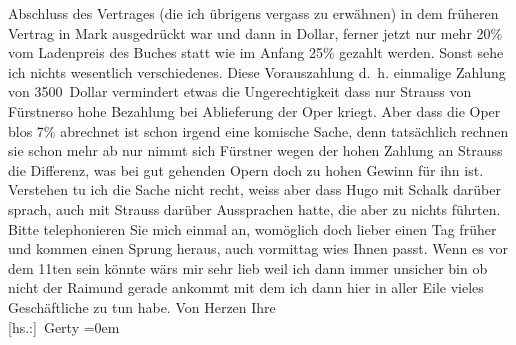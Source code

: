 \begin{ledgroupsized}[t]{13cm}
               Abschluss des Vertrages (die ich übrigens vergass zu erwähnen) in dem früheren
               Vertrag in Mark ausgedrückt war und dann in Dollar, ferner jetzt nur mehr 20{\%} vom Ladenpreis des Buches statt wie im Anfang 25{\%} gezahlt werden. Sonst sehe ich nichts wesentlich
               verschiedenes. Diese Vorauszahlung d. h. einmalige Zahlung von 3500 Dollar vermindert
               etwas die Ungerechtigkeit dass nur Strauss von
                  Fürstnerso hohe Bezahlung bei Ablieferung der Oper kriegt.
               Aber dass die Oper blos 7{\%} abrechnet ist schon irgend eine
               komische Sache, denn tatsächlich rechnen sie schon mehr ab nur nimmt sich Fürstner wegen der hohen Zahlung an Strauss die Differenz, was bei gut gehenden
               Opern doch zu hohen Gewinn für ihn ist. Verstehen tu ich die Sache nicht recht, weiss
               aber dass Hugo mit Schalk darüber sprach, auch mit Strauss darüber Aussprachen hatte, die aber zu nichts
               führten.\pend
           \pstart
           Bitte telephonieren Sie mich einmal an, womöglich doch lieber einen Tag früher und
               kommen einen Sprung heraus, auch vormittag wies Ihnen passt.\pend
           \pstart
           Wenn es vor dem 11ten{ }sein könnte wärs mir sehr lieb weil ich dann immer
               unsicher bin ob nicht der Raimund gerade
               ankommt mit dem ich dann hier in aller Eile vieles Geschäftliche zu tun habe.\pend
           \pstart
           Von Herzen Ihre{\\[\baselineskip]}\spacefill\mbox{{[}hs.:{]} Gerty}\pend
           \leftskip=0em{}
         
         \endnumbering{}\end{ledgroupsized}  \newcommand{\dateiname}{L02544}\newcommand{\titel}{Gerty von Hofmannsthal an Arthur Schnitzler, [5. 3. 1931]}\newcommand{\editorInnen}{Martin Anton Müller und Gerd-Hermann Susen}
      